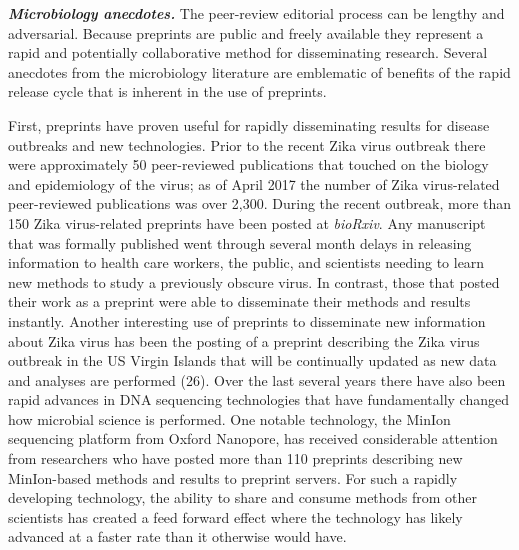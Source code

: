 \documentclass[11,]{article}
\begin{document}
\textbf{\emph{Microbiology anecdotes.}} The peer-review editorial
process can be lengthy and adversarial. Because preprints are public and
freely available they represent a rapid and potentially collaborative
method for disseminating research. Several anecdotes from the
microbiology literature are emblematic of benefits of the rapid release
cycle that is inherent in the use of preprints.

First, preprints have proven useful for rapidly disseminating results
for disease outbreaks and new technologies. Prior to the recent Zika
virus outbreak there were approximately 50 peer-reviewed publications
that touched on the biology and epidemiology of the virus; as of April
2017 the number of Zika virus-related peer-reviewed publications was
over 2,300. During the recent outbreak, more than 150 Zika virus-related
preprints have been posted at \emph{bioRxiv}. Any manuscript that was
formally published went through several month delays in releasing
information to health care workers, the public, and scientists needing
to learn new methods to study a previously obscure virus. In contrast,
those that posted their work as a preprint were able to disseminate
their methods and results instantly. Another interesting use of
preprints to disseminate new information about Zika virus has been the
posting of a preprint describing the Zika virus outbreak in the US
Virgin Islands that will be continually updated as new data and analyses
are performed (26). Over the last several years there have also been
rapid advances in DNA sequencing technologies that have fundamentally
changed how microbial science is performed. One notable technology, the
MinIon sequencing platform from Oxford Nanopore, has received
considerable attention from researchers who have posted more than 110
preprints describing new MinIon-based methods and results to preprint
servers. For such a rapidly developing technology, the ability to share
and consume methods from other scientists has created a feed forward
effect where the technology has likely advanced at a faster rate than it
otherwise would have.
\end{document}
